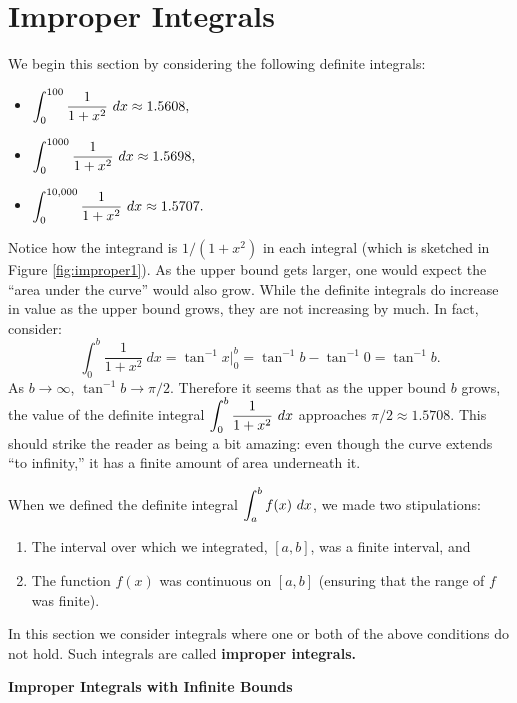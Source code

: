 \section{Improper Integrals}\label{sec:improper_integration}

We begin this section by considering the following definite integrals:
\begin{itemize}
\item	$\displaystyle \int_0^{100}\frac1{1+x^2}\ dx \approx 1.5608,$
\item	$\displaystyle \int_0^{1000}\frac1{1+x^2}\ dx \approx 1.5698,$
\item	$\displaystyle \int_0^{10,000}\frac1{1+x^2}\ dx \approx 1.5707.$
\end{itemize}

Notice how the integrand is $1/(1+x^2)$ in each integral (which is sketched in Figure \ref{fig:improper1}). As the upper bound gets larger, one would expect the ``area under the curve'' would also grow. While the definite integrals do increase in value as the upper bound grows, they are not  increasing by much. In fact, consider:
$$\int_0^b \frac{1}{1+x^2}\ dx = \tan^{-1}x\Big|_0^b = \tan^{-1}b-\tan^{-1}0 = \tan^{-1}b.$$
As $b\rightarrow \infty$, $\tan^{-1}b \rightarrow \pi/2.$ Therefore it seems that as the upper bound $b$ grows, the value of the definite integral $\displaystyle \int_0^b\frac{1}{1+x^2}\ dx$ approaches $\pi/2\approx 1.5708$. This should strike the reader as being a bit amazing: even though the curve extends ``to infinity,'' it has a finite amount of area underneath it.


When we defined the definite integral $\displaystyle\int_a^b f(x)\ dx$, we made two stipulations:
	\begin{enumerate}
	\item		The interval over which we integrated, $[a,b]$, was a finite interval, and
	\item		The function $f(x)$ was continuous on $[a,b]$ (ensuring that the range of $f$ was finite).
	\end{enumerate}
	
In this section we consider integrals where one or both of the above conditions do not hold. Such integrals are called \textbf{improper integrals.}
\clearpage

\noindent\textbf{\large Improper Integrals with Infinite Bounds}

